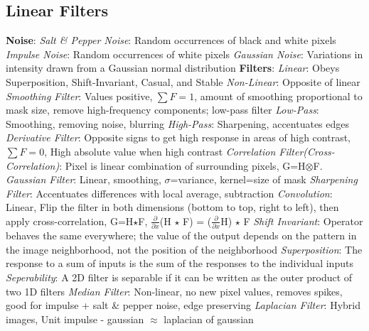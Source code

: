 \documentclass{article}
\author{Ian Chen}
\date{\today}
\begin{document}
    \begin{multicols*}{2}
        \subsection*{Linear Filters}
        \textbf{Noise}:\newline
        \textit{Salt \& Pepper Noise}: Random occurrences of black and white pixels\newline
        \textit{Impulse Noise}: Random occurrences of white pixels\newline
        \textit{Gaussian Noise}: Variations in intensity drawn from a Gaussian normal distribution\newline
        \textbf{Filters}:\newline
        \textit{Linear}: Obeys Superposition, Shift-Invariant, Casual, and Stable\newline
        \textit{Non-Linear}: Opposite of linear\newline
        \textit{Smoothing Filter}: Values positive, $\sum F=1$, amount of smoothing proportional to mask size, remove
        high-frequency components; low-pass filter\newline
        \textit{Low-Pass}: Smoothing, removing noise, blurring\newline
        \textit{High-Pass}: Sharpening, accentuates edges\newline
        \textit{Derivative Filter}: Opposite signs to get high response in areas of high contrast, $\sum F=0$, High
        absolute value when high contrast\newline
        \textit{Correlation Filter(Cross-Correlation)}: Pixel is linear combination of surrounding pixels,
        G=H$\otimes$F.\newline
        \textit{Gaussian Filter}: Linear, smoothing, $\sigma$=variance, kernel=size of mask\newline
        \textit{Sharpening Filter}: Accentuates differences with local average, subtraction\newline
        \textit{Convolution}: Linear, Flip the filter in both dimensions (bottom to top, right to left), then apply
        cross-correlation, G=H$\star$F, $\frac{\partial}{\partial x}$(H $\star$ F) = ($\frac{\partial}{\partial x}$H) $\star$ F\newline
        \textit{Shift Invariant}: Operator behaves the same everywhere; the value of the output depends on the
        pattern in the image neighborhood, not the position of the neighborhood\newline
        \textit{Superposition}: The response to a sum of inputs is the sum of the responses to the individual inputs\newline
        \textit{Seperability}: A 2D filter is separable if it can be written as the outer product of two 1D filters\newline
        \textit{Median Filter}: Non-linear, no new pixel values, removes spikes, good for impulse + salt \& pepper
        noise, edge preserving\newline
        \textit{Laplacian Filter}: Hybrid images, Unit impulse - gaussian $\approx$ laplacian of gaussian\newline

\end{multicols*}
\end{document}
